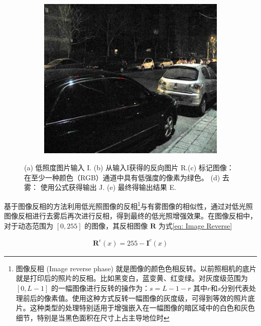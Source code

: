 \documentclass[a4paper, 10pt]{article}
\begin{document}
\begin{figure}[htbp]
\begin{subfigure}{0.18\textwidth}
			\captionsetup{font=scriptsize}
			\label{fig: de-haze}
		\end{subfigure}
		\begin{subfigure}{0.18\textwidth}
			\includegraphics[width=\linewidth]{picture/LLIE/Inverse/Final output}
			\captionsetup{font=scriptsize}
			\label{fig: Final output}
		\end{subfigure}
		\caption{
			\label{fig: Image Inverse}
			(a) 低照度图片输入 I. (b) 从输入I获得的反向图片 R.(c) 标记图像：在至少一种颜色（RGB）通道中具有低强度的像素为绿色。 (d) 去雾： 使用公式获得输出 J. (e) 最终得输出结果 E.
		}
	\end{figure}
	
	基于图像反相的方法\cite{dong2010fast}利用低光照图像的反相\footnote{图像反相 (Image reverse phase) 就是图像的颜色色相反转。以前照相机的底片就是打印后的照片的反相。比如黑变白，蓝变黄、红变绿。对灰度级范围为 $[0 , L-1]$ 的一幅图像进行反转的操作为：$s = L - 1 - r$ 其中$r$和$s$分别代表处理前后的像素值。使用这种方式反转一幅图像的灰度级，可得到等效的照片底片。这种类型的处理特别适用于增强嵌入在一幅图像的暗区域中的白色和灰色细节，特别是当黑色面积在尺寸上占主导地位时}与有雾图像的相似性，通过对低光照图像反相进行去雾后再次进行反相，得到最终的低光照增强效果。在图像反相中，对于动态范围为 $[ 0, 255]$ 的图像，其反相图像 $\mathbf{R}$ 为式\ref{eq: Image Reverse} 
	
	\begin{equation}
		\begin{aligned}
			\mathbf{R}^c (x) = 255 - \mathbf{I}^c(x)
		\end{aligned}
		\label{eq: Image Reverse}
	\end{equation}
	
\end{document}
